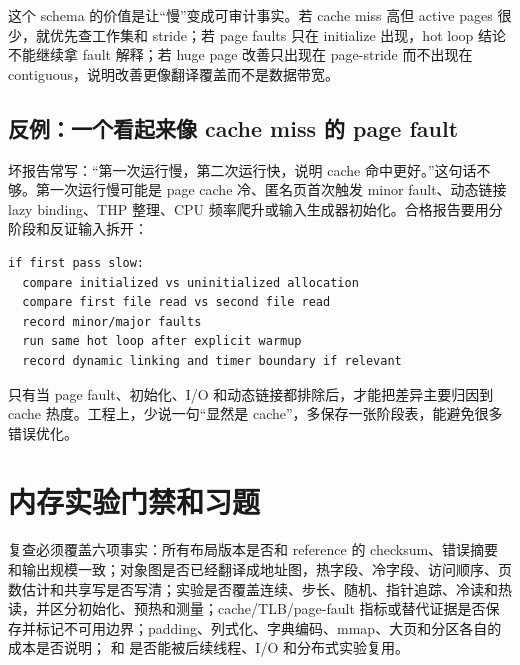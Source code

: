 这个 schema 的价值是让“慢”变成可审计事实。若 cache miss 高但 active pages 很少，就优先查工作集和 stride；若 page faults 只在 initialize 出现，hot loop 结论不能继续拿 fault 解释；若 huge page 改善只出现在 page-stride 而不出现在 contiguous，说明改善更像翻译覆盖而不是数据带宽。

\subsection{反例：一个看起来像 cache miss 的 page fault}

坏报告常写：“第一次运行慢，第二次运行快，说明 cache 命中更好。”这句话不够。第一次运行慢可能是 page cache 冷、匿名页首次触发 minor fault、动态链接 lazy binding、THP 整理、CPU 频率爬升或输入生成器初始化。合格报告要用分阶段和反证输入拆开：

\begin{lstlisting}[numbers=none,caption={拆开首次慢的反证路径}]
if first pass slow:
  compare initialized vs uninitialized allocation
  compare first file read vs second file read
  record minor/major faults
  run same hot loop after explicit warmup
  record dynamic linking and timer boundary if relevant
\end{lstlisting}

只有当 page fault、初始化、I/O 和动态链接都排除后，才能把差异主要归因到 cache 热度。工程上，少说一句“显然是 cache”，多保存一张阶段表，能避免很多错误优化。

\section{内存实验门禁和习题}

复查必须覆盖六项事实：所有布局版本是否和 reference 的 checksum、错误摘要和输出规模一致；对象图是否已经翻译成地址图，热字段、冷字段、访问顺序、页数估计和共享写是否写清；实验是否覆盖连续、步长、随机、指针追踪、冷读和热读，并区分初始化、预热和测量；cache/TLB/page-fault 指标或替代证据是否保存并标记不可用边界；padding、列式化、字典编码、mmap、大页和分区各自的成本是否说明； 和  是否能被后续线程、I/O 和分布式实验复用。

